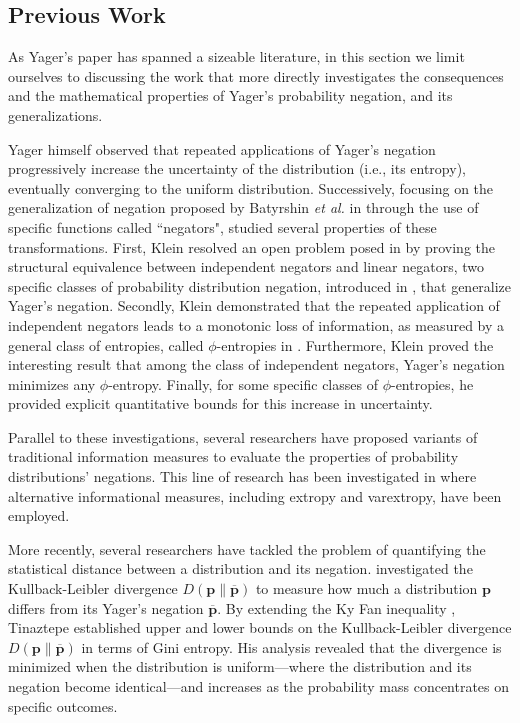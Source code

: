 \documentclass[pdflatex,sn-basic,iicol]{sn-jnl}%
\theoremstyle{thmstyleone}%
\theoremstyle{thmstyletwo}%
\theoremstyle{thmstylethree}%
\newcommand{\bp}{\mathbf{p}}
\begin{document}
\subsection{Previous Work}

As Yager's paper \citep{Yager2015} has spanned a sizeable
literature, in this section we limit ourselves to discussing the work that more directly
investigates
the consequences and the mathematical properties of Yager's probability negation,
and its generalizations.

Yager himself \citep{Yager2015} observed that repeated applications of Yager’s negation progressively increase the uncertainty of the distribution (i.e., its entropy), eventually converging to the uniform distribution. Successively, focusing on the generalization of negation proposed by  Batyrshin \textit{et al.} in  \citep{generating} through the use of specific %
functions called  ``negators", \cite{klein2022some} studied several 
properties of these transformations. First, Klein resolved an open problem 
posed in \citep{batyrshin2021contracting}
by proving the structural equivalence between independent negators and linear negators, two specific classes of 
probability distribution negation, introduced
in \citep{generating}, that generalize Yager's negation. Secondly, Klein demonstrated that the repeated application of independent negators
leads to a monotonic loss of information, as measured by
a general class of entropies, called  $\phi$-entropies in \citep{klein2022some}. 
Furthermore, Klein proved the interesting result that
among the class of independent negators,  Yager’s negation minimizes any $\phi$-entropy. Finally, for some specific classes of $\phi$-entropies, he provided explicit quantitative bounds for this increase in uncertainty.

Parallel to these investigations, 
several researchers have proposed variants of traditional information measures to  evaluate
the properties of probability distributions' negations. 
This line of research has been investigated in \citep{chaudhary2025extension, Deng_extropy2024}
 where
 alternative informational measures, including extropy and varextropy, have been employed.

More recently, several researchers have tackled the problem of
 quantifying the statistical distance between a distribution and its negation. 
\cite{tinaztepe2023application} investigated the Kullback-Leibler divergence $D(\bp\|\overline{\bp})$ to measure how much a distribution $\bp$ differs from its Yager's negation $\overline{\bp}$. By extending the Ky Fan inequality \citep{beckenbach2012inequalities}, Tinaztepe established  upper and lower bounds on  the Kullback-Leibler divergence  $D(\bp\|\overline{\bp})$ in terms of Gini entropy. His analysis revealed that the divergence is minimized when the distribution is uniform---where the distribution and its negation become identical---and increases as the probability mass concentrates on specific outcomes.
\end{document}
